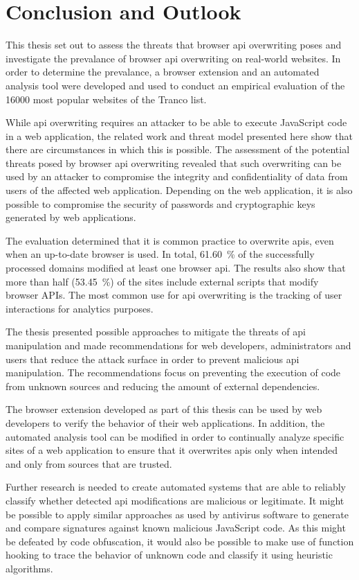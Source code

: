\chapter{Conclusion and Outlook}
\label{sec.conclusion}

This thesis set out to assess the threats that browser \ac{api} overwriting poses and investigate the prevalance of browser \ac{api} overwriting on real-world websites. In order to determine the prevalance, a browser extension and an automated analysis tool were developed and used to conduct an empirical evaluation of the \num[round-precision=0]{16000} most popular websites of the Tranco list.

While \ac{api} overwriting requires an attacker to be able to execute JavaScript code in a web application, the related work and threat model presented here show that there are circumstances in which this is possible. The assessment of the potential threats posed by browser \ac{api} overwriting revealed that such overwriting can be used by an attacker to compromise the integrity and confidentiality of data from users of the affected web application. Depending on the web application, it is also possible to compromise the security of passwords and cryptographic keys generated by web applications.

The evaluation determined that it is common practice to overwrite \acsp{api}, even when an up-to-date browser is used. In total, \SI[round-precision=0]{61.60}{\percent} of the successfully processed domains modified at least one browser \ac{api}. The results also show that more than half (\SI[round-precision=0]{53.45}{\percent}) of the sites include external scripts that modify browser APIs. The most common use for \ac{api} overwriting is the tracking of user interactions for analytics purposes.

The thesis presented possible approaches to mitigate the threats of \ac{api} manipulation and made recommendations for web developers, administrators and users that reduce the attack surface in order to prevent malicious \ac{api} manipulation. The recommendations focus on preventing the execution of code from unknown sources and reducing the amount of external dependencies.

The browser extension developed as part of this thesis can be used by web developers to verify the behavior of their web applications. In addition, the automated analysis tool can be modified in order to continually analyze specific sites of a web application to ensure that it overwrites \acsp{api} only when intended and only from sources that are trusted.

Further research is needed to create automated systems that are able to reliably classify whether detected \ac{api} modifications are malicious or legitimate. It might be possible to apply similar approaches as used by antivirus software to generate and compare signatures against known malicious JavaScript code. As this might be defeated by code obfuscation, it would also be possible to make use of function hooking to trace the behavior of unknown code and classify it using heuristic algorithms.
